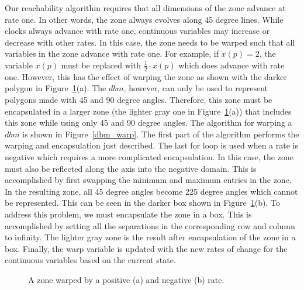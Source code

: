 \documentclass[11pt,times]{article}
\begin{document}
Our reachability algorithm requires that all dimensions of the zone advance 
at rate one.  In other words, the zone always evolves along 45 degree lines.  
While clocks always
advance with rate one, continuous variables may increase or decrease with
other rates.  In this case, the zone needs to be warped such that all 
variables in the zone advance with rate one.  For example, if $\dot{x}(p)=2$,
the variable $x(p)$ must be replaced with $\frac{1}{2} \cdot x(p)$ which does 
advance with rate one.  However, this has the effect of warping the zone as 
shown with the darker polygon in Figure~\ref{zone_warp}(a).  The $dbm$, 
however, can only be used to represent polygons made with 45 and 90 degree 
angles.  Therefore, this zone must be encapsulated in a larger zone (the 
lighter gray one in Figure~\ref{zone_warp}(a)) that includes this zone while 
using only 45 and 90 degree angles.  The algorithm for warping a $dbm$ is 
shown in  Figure~\ref{dbm_warp}.  The first part of the algorithm performs the 
warping and encapsulation just described.  The last for loop is used when
a rate is negative which requires a more complicated encapsulation.  In this
case, the zone must also be reflected along the axis into the negative domain.
This is accomplished by first swapping the minimum and maximum entries in the 
zone.  In the resulting zone, all 45 degree angles become 225 degree angles 
which cannot be represented.  This can be seen in the darker box shown in
Figure~\ref{zone_warp}(b).  To address this problem, we must encapsulate the 
zone in a box.  This is accomplished by setting all the separations in the 
corresponding row and column to infinity.
The lighter gray zone is the result after encapsulation of the zone in a box.  
Finally, the warp variable is updated with the new rates 
of change for the continuous variables based on the current state. 

  \begin{figure}[htbp]
    \begin{center}
      \caption{\label{zone_warp} A zone warped by a positive (a) and
      negative (b) rate. }
    \end{center}
  \end{figure}
  
\end{document}

